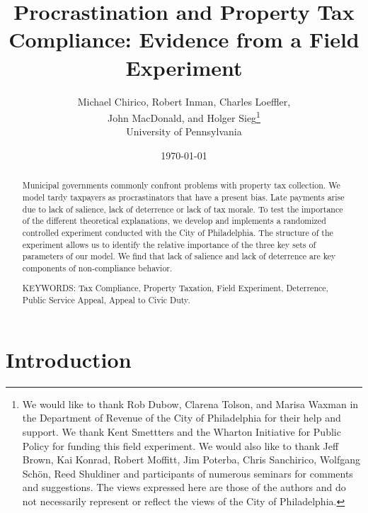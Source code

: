 \documentclass[12pt]{article}
\renewcommand{\thefootnote}{\fnsymbol{footnote}}
\begin{document}
\title{Procrastination and Property Tax Compliance: Evidence from a Field Experiment}

\author{Michael Chirico, Robert Inman, Charles Loeffler, \\ 
John MacDonald, and Holger Sieg\thanks{We would like to thank Rob Dubow,
    Clarena Tolson, and Marisa Waxman in the Department of Revenue of
    the City of Philadelphia for their help and support. We thank Kent
    Smettters and the Wharton Initiative for Public Policy for funding
    this field experiment. We would also like to thank Jeff Brown, Kai
    Konrad, Robert Moffitt, Jim Poterba, Chris Sanchirico, Wolfgang
    Sch\"on, Reed Shuldiner and participants of numerous seminars for
    comments and suggestions. The views expressed here are those of
    the authors and do not necessarily represent or reflect the views
    of the City of Philadelphia.}  \\ 
University of Pennsylvania}

\date{\today}

\maketitle

\begin{abstract}

Municipal governments commonly confront problems with property tax collection.  We model tardy taxpayers as procrastinators that have a present bias. Late payments arise due to lack of salience, lack of deterrence or lack of tax morale.  To test the importance of the different theoretical explanations, we develop and implements a randomized controlled
experiment conducted with the City of Philadelphia. The structure of the experiment allows us to identify the relative importance of the three key sets of parameters of our model.  We find that  lack of salience and lack of deterrence  are key components of non-compliance behavior. 

\bigskip

\noindent KEYWORDS: Tax Compliance, Property Taxation, Field
Experiment, Deterrence, Public Service Appeal, Appeal to Civic Duty.

\end{abstract}
\renewcommand{\thefootnote}{\arabic{footnote}}

\newpage

\section{Introduction}
\end{document}
